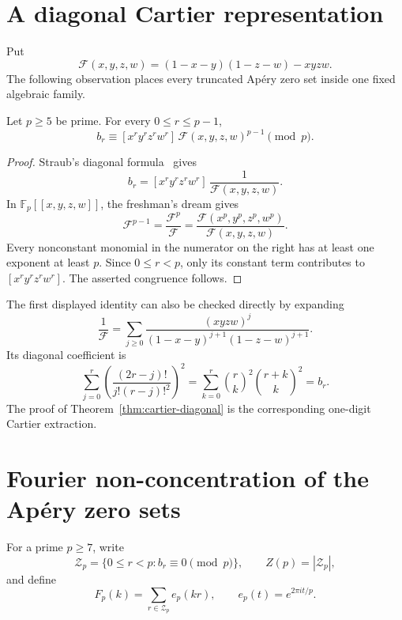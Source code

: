 
\section{A diagonal Cartier representation}
\label{sec:cartier-diagonal}

Put
\[
 \mathscr F(x,y,z,w)
  =(1-x-y)(1-z-w)-xyzw.
\]
The following observation places every truncated Ap\'ery zero set inside
one fixed algebraic family.

\begin{theorem}
\label{thm:cartier-diagonal}
Let \(p\ge5\) be prime.  For every \(0\le r\le p-1\),
\[
 b_r\equiv
 [x^ry^rz^rw^r]\,\mathscr F(x,y,z,w)^{p-1}
 \pmod p.
\]
\end{theorem}

\begin{proof}
Straub's diagonal formula~\cite[Theorem~1.1]{Straub2014} gives
\[
 b_r=[x^ry^rz^rw^r]\,\frac1{\mathscr F(x,y,z,w)}.
\]
In \(\mathbb F_p[[x,y,z,w]]\), the freshman's dream gives
\[
 \mathscr F^{p-1}
 =\frac{\mathscr F^p}{\mathscr F}
 =\frac{\mathscr F(x^p,y^p,z^p,w^p)}{\mathscr F(x,y,z,w)}.
\]
Every nonconstant monomial in the numerator on the right has at least
one exponent at least \(p\).  Since \(0\le r<p\), only its constant
term contributes to \([x^ry^rz^rw^r]\).  The asserted congruence
follows.
\end{proof}

\begin{remark}
The first displayed identity can also be checked directly by expanding
\[
 \frac1{\mathscr F}
 =\sum_{j\ge0}
 \frac{(xyzw)^j}
 {(1-x-y)^{j+1}(1-z-w)^{j+1}}.
\]
Its diagonal coefficient is
\[
 \sum_{j=0}^r
 \left(\frac{(2r-j)!}{j!(r-j)!^2}\right)^2
 =\sum_{k=0}^r
 \binom rk^2\binom{r+k}{k}^2=b_r.
\]
The proof of Theorem~\ref{thm:cartier-diagonal} is the corresponding
one-digit Cartier extraction.
\end{remark}


\section{Fourier non-concentration of the Ap\'ery zero sets}
\label{sec:fourier-nonconcentration}

For a prime \(p\ge7\), write
\[
 \mathcal Z_p=\{0\le r<p:b_r\equiv0\pmod p\},
 \qquad Z(p)=|\mathcal Z_p|,
\]
and define
\[
 F_p(k)=\sum_{r\in\mathcal Z_p}e_p(kr),
 \qquad e_p(t)=e^{2\pi i t/p}.
\]

